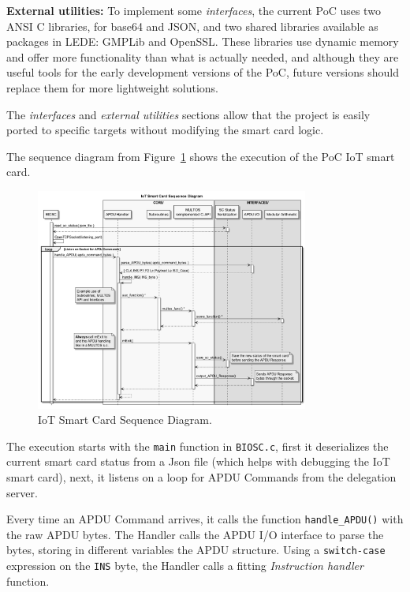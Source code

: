 \hfil

\textbf{External utilities:} To implement some \textit{interfaces}, the current PoC uses two ANSI C libraries, for base64 and JSON, and two shared libraries available as packages in LEDE: GMPLib and OpenSSL. These libraries use dynamic memory and offer more functionality than what is actually needed, and although they are useful tools for the early development versions of the PoC, future versions should replace them for more lightweight solutions.

\hfil

The \textit{interfaces} and \textit{external utilities} sections  allow that the project is easily ported to specific targets without modifying the smart card logic.


\hfil


The sequence diagram from Figure~\ref{fig:sequenceBIOSC} shows the execution of the PoC IoT smart card.



\begin{figure}[bth]
	\centering
	\includegraphics[width=0.8\textwidth]{gfx/UML/sequenceBIOSC}
	\caption{IoT Smart Card Sequence Diagram.}
	\label{fig:sequenceBIOSC}
\end{figure}



The execution starts with the \texttt{main} function in \texttt{BIOSC.c}, first it deserializes the current smart card status from a Json file (which helps with debugging the IoT smart card), next, it listens on a loop for APDU Commands from the delegation server.

Every time an APDU Command arrives, it calls the function \texttt{handle\_APDU()} with the raw APDU bytes. The Handler calls the APDU I/O interface to parse the bytes, storing in different variables the APDU structure. Using a \texttt{switch-case} expression on the \texttt{INS} byte, the Handler calls a fitting \textit{Instruction handler} function.

